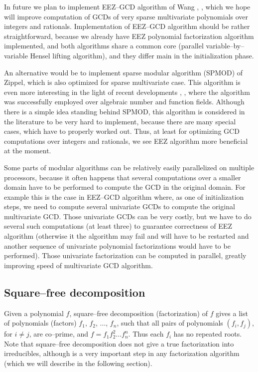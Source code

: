 In future we plan to implement EEZ--GCD algorithm of Wang \cite{Wang1980eezgcd}, \cite{Moses1973ezgcd},
which we hope will improve computation of GCDs of very sparse multivariate polynomials over
integers and rationals. Implementation of EEZ--GCD algorithm should be rather straightforward,
because we already have EEZ polynomial factorization algorithm implemented, and both algorithms
share a common core (parallel variable--by--variable Hensel lifting algorithm), and they differ
main in the initialization phase.

An alternative would be to implement sparse modular algorithm (SPMOD) of Zippel, which is also
optimized for sparse multivariate case. This algorithm is even more interesting in the light
of recent developments \cite{Monagan2004algebraic}, \cite{Javadi2007spmod}, where the algorithm was
successfully employed over algebraic number and function fields. Although there is a simple
idea standing behind SPMOD, this algorithm is considered in the literature to be very hard
to implement, because there are many special cases, which have to properly worked out. Thus,
at least for optimizing GCD computations over integers and rationals, we see EEZ algorithm
more beneficial at the moment.

Some parts of modular algorithms can be relatively easily parallelized on multiple processors,
because it often happens that several computations over a smaller domain have to be performed
to compute the GCD in the original domain. For example this is the case in EEZ--GCD algorithm
where, as one of initialization steps, we need to compute several univariate GCDs to compute
the original multivariate GCD. Those univariate GCDs can be very costly, but we have to do
several such computations (at least three) to guarantee correctness of EEZ algorithm (otherwise
it the algorithm may fail and will have to be restarted and another sequence of univariate
polynomial factorizations would have to be performed). Those univariate factorization can
be computed in parallel, greatly improving speed of multivariate GCD algorithm.


\subsection{Square--free decomposition}

Given a polynomial $f$, square--free decomposition (factorization) of $f$ gives a list of
polynomials (factors) $f_1$, $f_2$, $\ldots$, $f_n$, such that all pairs of polynomials
$(f_i, f_j)$, for $i \not= j$, are co--prime, and $f = f_1 f_2^2 \ldots f_n^n$. Thus each
$f_i$ has no repeated roots. Note that square--free decomposition does not give a true
factorization into irreducibles, although is a very important step in any factorization
algorithm (which we will describe in the following section).

